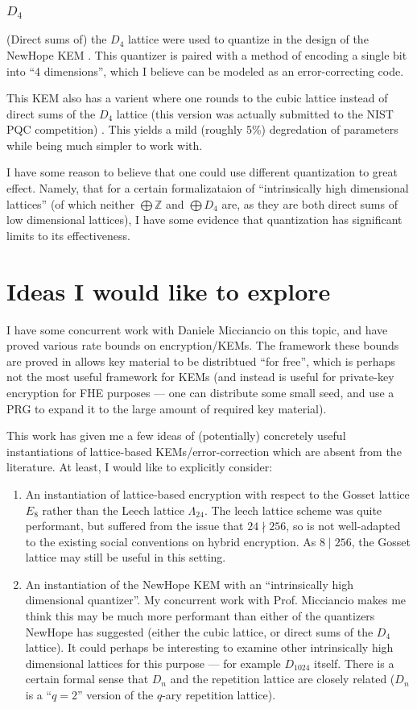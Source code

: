 \documentclass{article}
\begin{document}
\subsubsection{$D_4$}
(Direct sums of) the $D_4$ lattice were used to quantize in the design of the NewHope KEM \cite{alkim_post-quantum_2015}.
This quantizer is paired with a method of encoding a single bit into ``4 dimensions'', which I believe can be modeled as an error-correcting code.

This KEM also has a varient where one rounds to the cubic lattice instead of direct sums of the $D_4$ lattice (this version was actually submitted to the NIST PQC competition) \cite{alkim_algorithm_nodate}.
This yields a mild (roughly 5\%) degredation of parameters while being much simpler to work with.

I have some reason to believe that one could use different quantization to great effect.
Namely, that for a certain formalizataion of ``intrinsically high dimensional lattices'' (of which neither $\bigoplus \mathbb{Z}$ and $\bigoplus D_4$ are, as they are both direct sums of low dimensional lattices), I have some evidence that quantization has significant limits to its effectiveness.

\section{Ideas I would like to explore}
I have some concurrent work with Daniele Micciancio on this topic, and have proved various rate bounds on encryption/KEMs.
The framework these bounds are proved in allows key material to be distribtued ``for free'', which is perhaps not the most useful framework for KEMs (and instead is useful for private-key encryption for FHE purposes --- one can distribute some small seed, and use a PRG to expand it to the large amount of required key material).

This work has given me a few ideas of (potentially) concretely useful instantiations of lattice-based KEMs/error-correction which are absent from the literature.
At least, I would like to explicitly consider:
\begin{enumerate}
	\item An instantiation of lattice-based encryption with respect to the Gosset lattice $E_8$ rather than the Leech lattice $\Lambda_{24}$.
	The leech lattice scheme was quite performant, but suffered from the issue that $24\nmid 256$, so is not well-adapted to the existing social conventions on hybrid encryption.
	As $8\mid 256$, the Gosset lattice may still be useful in this setting.
	\item An instantiation of the NewHope KEM with an ``intrinsically high dimensional quantizer''.
	My concurrent work with Prof. Micciancio makes me think this may be much more performant than either of the quantizers NewHope has suggested (either the cubic lattice, or direct sums of the $D_4$ lattice).
	It could perhaps be interesting to examine other intrinsically high dimensional lattices for this purpose --- for example $D_{1024}$ itself.
	There is a certain formal sense that $D_n$ and the repetition lattice are closely related ($D_n$ is a ``$q = 2$'' version of the $q$-ary repetition lattice).
\end{enumerate}




\end{document}
